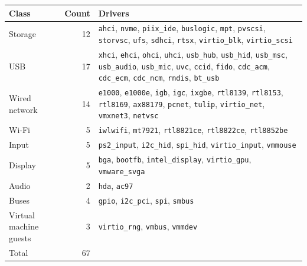 \begin{tabular}{@{}lr>{\raggedright\arraybackslash}p{9.2cm}@{}}
\toprule Class & Count & Drivers\\ \midrule
Storage & 12 & {\footnotesize \texttt{ahci}, \texttt{nvme}, \texttt{piix\_ide}, \texttt{buslogic}, \texttt{mpt}, \texttt{pvscsi}, \texttt{storvsc}, \texttt{ufs}, \texttt{sdhci}, \texttt{rtsx}, \texttt{virtio\_blk}, \texttt{virtio\_scsi}}\\
USB & 17 & {\footnotesize \texttt{xhci}, \texttt{ehci}, \texttt{ohci}, \texttt{uhci}, \texttt{usb\_hub}, \texttt{usb\_hid}, \texttt{usb\_msc}, \texttt{usb\_audio}, \texttt{usb\_mic}, \texttt{uvc}, \texttt{ccid}, \texttt{fido}, \texttt{cdc\_acm}, \texttt{cdc\_ecm}, \texttt{cdc\_ncm}, \texttt{rndis}, \texttt{bt\_usb}}\\
Wired network & 14 & {\footnotesize \texttt{e1000}, \texttt{e1000e}, \texttt{igb}, \texttt{igc}, \texttt{ixgbe}, \texttt{rtl8139}, \texttt{rtl8153}, \texttt{rtl8169}, \texttt{ax88179}, \texttt{pcnet}, \texttt{tulip}, \texttt{virtio\_net}, \texttt{vmxnet3}, \texttt{netvsc}}\\
Wi-Fi & 5 & {\footnotesize \texttt{iwlwifi}, \texttt{mt7921}, \texttt{rtl8821ce}, \texttt{rtl8822ce}, \texttt{rtl8852be}}\\
Input & 5 & {\footnotesize \texttt{ps2\_input}, \texttt{i2c\_hid}, \texttt{spi\_hid}, \texttt{virtio\_input}, \texttt{vmmouse}}\\
Display & 5 & {\footnotesize \texttt{bga}, \texttt{bootfb}, \texttt{intel\_display}, \texttt{virtio\_gpu}, \texttt{vmware\_svga}}\\
Audio & 2 & {\footnotesize \texttt{hda}, \texttt{ac97}}\\
Buses & 4 & {\footnotesize \texttt{gpio}, \texttt{i2c\_pci}, \texttt{spi}, \texttt{smbus}}\\
Virtual machine guests & 3 & {\footnotesize \texttt{virtio\_rng}, \texttt{vmbus}, \texttt{vmmdev}}\\
\midrule Total & 67 & \\
\bottomrule
\end{tabular}
